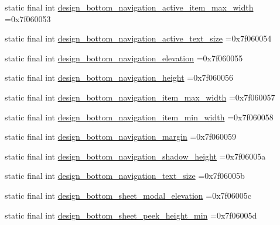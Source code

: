 \begin{DoxyCompactItemize}
\item 
static final int \mbox{\hyperlink{classbr_1_1unb_1_1cic_1_1mp_1_1marketmaster_1_1test_1_1R_1_1dimen_a02a13d2c8a437ff0c6233beea7f90c16}{design\+\_\+bottom\+\_\+navigation\+\_\+active\+\_\+item\+\_\+max\+\_\+width}} =0x7f060053
\item 
static final int \mbox{\hyperlink{classbr_1_1unb_1_1cic_1_1mp_1_1marketmaster_1_1test_1_1R_1_1dimen_a68084fb515be9aec9327104f67a346ba}{design\+\_\+bottom\+\_\+navigation\+\_\+active\+\_\+text\+\_\+size}} =0x7f060054
\item 
static final int \mbox{\hyperlink{classbr_1_1unb_1_1cic_1_1mp_1_1marketmaster_1_1test_1_1R_1_1dimen_a45c269db1b53a8a4500a68585a331417}{design\+\_\+bottom\+\_\+navigation\+\_\+elevation}} =0x7f060055
\item 
static final int \mbox{\hyperlink{classbr_1_1unb_1_1cic_1_1mp_1_1marketmaster_1_1test_1_1R_1_1dimen_aea32918b38366621235934b6494a0cf7}{design\+\_\+bottom\+\_\+navigation\+\_\+height}} =0x7f060056
\item 
static final int \mbox{\hyperlink{classbr_1_1unb_1_1cic_1_1mp_1_1marketmaster_1_1test_1_1R_1_1dimen_aad6f37be366b069eb8c70da1a845f441}{design\+\_\+bottom\+\_\+navigation\+\_\+item\+\_\+max\+\_\+width}} =0x7f060057
\item 
static final int \mbox{\hyperlink{classbr_1_1unb_1_1cic_1_1mp_1_1marketmaster_1_1test_1_1R_1_1dimen_abb6d40b450bda76966e0df10edcca071}{design\+\_\+bottom\+\_\+navigation\+\_\+item\+\_\+min\+\_\+width}} =0x7f060058
\item 
static final int \mbox{\hyperlink{classbr_1_1unb_1_1cic_1_1mp_1_1marketmaster_1_1test_1_1R_1_1dimen_a5678f87996d4969d8a36e75b8eda0332}{design\+\_\+bottom\+\_\+navigation\+\_\+margin}} =0x7f060059
\item 
static final int \mbox{\hyperlink{classbr_1_1unb_1_1cic_1_1mp_1_1marketmaster_1_1test_1_1R_1_1dimen_a0560a90dfd066475ed85525fedbcddff}{design\+\_\+bottom\+\_\+navigation\+\_\+shadow\+\_\+height}} =0x7f06005a
\item 
static final int \mbox{\hyperlink{classbr_1_1unb_1_1cic_1_1mp_1_1marketmaster_1_1test_1_1R_1_1dimen_a82dde609d0a488e25be86569a464bf56}{design\+\_\+bottom\+\_\+navigation\+\_\+text\+\_\+size}} =0x7f06005b
\item 
static final int \mbox{\hyperlink{classbr_1_1unb_1_1cic_1_1mp_1_1marketmaster_1_1test_1_1R_1_1dimen_a2e51d1d480c1b5dd66620db60c26e5f4}{design\+\_\+bottom\+\_\+sheet\+\_\+modal\+\_\+elevation}} =0x7f06005c
\item 
static final int \mbox{\hyperlink{classbr_1_1unb_1_1cic_1_1mp_1_1marketmaster_1_1test_1_1R_1_1dimen_ab58ae7988ca188c8b98b590cfabeb8aa}{design\+\_\+bottom\+\_\+sheet\+\_\+peek\+\_\+height\+\_\+min}} =0x7f06005d

\end{DoxyCompactItemize}
